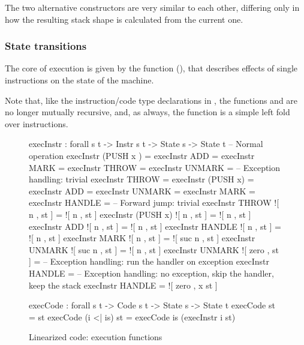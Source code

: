 \noindent The two alternative constructors are very similar to each other,
differing only in how the resulting stack shape is calculated from the current
one.

\subsubsection{State transitions}
\label{sec:lin-instr-semantics}

The core of execution is given by the function  (),
that describes effects of single instructions on the state of the machine.

Note that, like the instruction/code type declarations in ,
the functions  and  are no longer mutually
recursive, and, as always, the function  is a simple left fold over
instructions.

\begin{figure}
\begin{codei}
  execInstr : forall {s t} -> Instr s t -> State s -> State t
  -- Normal operation
  execInstr (PUSH  x ) \tick[         	st ] = \tick[ x \scons st ]
  execInstr  ADD        = \tick[ (x + y) \scons st ]
  execInstr  MARK      \tick[          	st ] = 
  execInstr  THROW     \tick[          	st ] = 
  execInstr  UNMARK     = \tick[ x \scons st ]
  -- Exception handling: trivial
  execInstr  THROW		\x[     n , st ] = \x[     n , st ]
  execInstr (PUSH x)	\x[     n , st ] = \x[     n , st ]
  execInstr  ADD		\x[     n , st ] = \x[     n , st ]
  execInstr  UNMARK		\x[     n , st ] = \x[     n , st ]
  execInstr  MARK		\x[     n , st ] = \x[ suc n , st ]
  execInstr  HANDLE		\x[ suc n , st ] = \x[     n , st ]
  -- Forward jump: trivial
  execInstr  THROW		![ n , st ] = ![ n , st ]
  execInstr (PUSH x)	![ n , st ] = ![ n , st ]
  execInstr  ADD		![ n , st ] = ![ n , st ]
  execInstr  HANDLE		![ n , st ] = ![ n , st ]
  execInstr  MARK		![     n , st ] = ![ suc n , st ]
  execInstr  UNMARK		![ suc n , st ] = ![     n , st ]
  execInstr  UNMARK		![ zero  , st ] = \tick[ st ]
  -- Exception handling: run the handler on exception
  execInstr  HANDLE		\x[ zero , st ] = \tick[ st ]
  -- Exception handling: no exception, skip the handler, keep the stack
  execInstr  HANDLE		 = ![ zero , x \scons st ]
\end{codei}
\begin{code}
    execCode : forall {s t} -> Code s t -> State s -> State t
    execCode \nil st = st
    execCode (i <| is) st = execCode is (execInstr i st)
\end{code}
\caption{Linearized code: execution functions}
\label{fig:lin-execInstr}
\end{figure}

